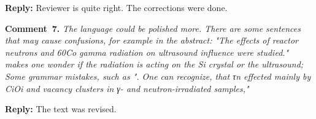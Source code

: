 \documentclass[aip,jap,preprint]{revtex4-1}
\begin{document}
\noindent
\textcolor[rgb]{0.51,0.00,0.00}{\textbf{Reply:}}
Reviewer is quite right.
The corrections were done.

\vspace{1cm}
\noindent
\textcolor[rgb]{0.00,0.50,1.00}{\textbf{Comment~7.}}
\emph{ The language could be polished more. There are some sentences that may cause confusions, for example in the abstract:
"The effects of reactor neutrons and 60Co gamma radiation on ultrasound influence were studied." makes one wonder if the radiation is acting on the Si crystal or the ultrasound;
Some grammar mistakes, such as
". One can recognize, that τn effected mainly by CiOi and vacancy clusters in γ- and neutron-irradiated samples,"}

\noindent
\textcolor[rgb]{0.51,0.00,0.00}{\textbf{Reply:}}
The text was revised.







\end{document}
